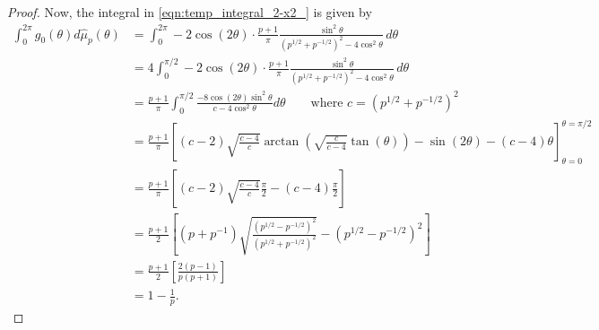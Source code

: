\documentclass[11pt,letterpaper,reqno]{amsart}
\theoremstyle{definition}
\numberwithin{equation}{section}
\numberwithin{figure}{section}
\numberwithin{table}{section}
\newcommand{\lrp}[1]{\!\left(#1\right)}
\newcommand{\lrb}[1]{\!\left[#1\right]}
\begin{document}
\begin{proof}
    Now, the integral in \eqref{eqn:temp_integral_2-x2_} is given by
    \begin{align} 
        \int_{0}^{2\pi} g_0(\theta) d\hat \mu_p(\theta) 
        &= \int_{0}^{2\pi} -2 \cos(2 \theta)\cdot \frac{p + 1}{\pi}  \frac{\sin^2 \theta}{\left( p^{1/2} + p^{-1/2} \right)^2 - 4 \cos^2 \theta} \, d \theta \\
        &= 4\int_{0}^{\pi/2} -2 \cos(2\theta) \cdot \frac{p + 1}{\pi}  \frac{\sin^2 \theta}{\left( p^{1/2} + p^{-1/2} \right)^2 - 4 \cos^2 \theta} \, d \theta \\
        &= \frac{p+1}{\pi} \int_{0}^{\pi/2}
        \frac{-8 \cos(2 \theta)\sin^2 \theta}{c-4\cos^2\theta} d\theta \qquad \text{where $c = \left( p^{1/2} + p^{-1/2} \right)^2$} \\
        &= 
        \frac{p+1}{\pi}
        \lrb{
            (c - 2)
            \sqrt{\tfrac{c - 4}{c}}  
            \arctan\left(\sqrt{\tfrac{c}{c-4}} \tan\left({\theta}\right)\right) - \sin(2\theta) - (c-4) \theta
        }_{\theta=0}^{\theta=\pi/2} \\
        &= \frac{p+1}{\pi} \lrb{
            (c-2) \sqrt{\tfrac{c-4}{c}} \frac{\pi}{2} - (c-4) \frac{\pi}{2} 
        } \\
        &= \frac{p+1}{2} \lrb{
            \lrp{p+p^{-1}} \sqrt{\frac{\left( p^{1/2} - p^{-1/2} \right)^2}{\left( p^{1/2} + p^{-1/2} \right)^2}}  - \left( p^{1/2} - p^{-1/2} \right)^2
        } \\
        &= \frac{p+1}{2} \lrb{\frac{2(p-1)}{p(p+1)}} \\
        &= 1 - \frac{1}{p}.
    \end{align}


\end{proof}
\end{document}
